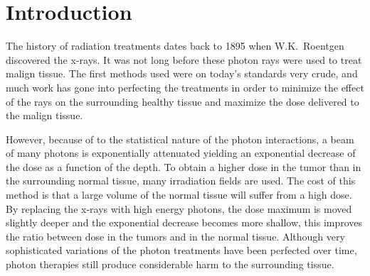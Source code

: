 %


\cleardoublepage
\storeinipagenumber
{}
\setcounter{page}{1}


\section{Introduction}
\thispagestyle{empty}
The history of radiation treatments dates back to 1895 when W.K.~Roentgen discovered the x-rays. It was not long before these photon rays were used to treat malign tissue. The first methods used were on today's standards very crude, and much work has gone into perfecting the treatments in order to minimize the effect of the rays on the surrounding healthy tissue and maximize the dose delivered to the malign tissue.

However, because of to the statistical nature of the photon interactions, a beam of many photons is
exponentially attenuated yielding an exponential decrease of the dose as a function of the depth. To
obtain a higher dose in the tumor than in the surrounding normal tissue, many irradiation
fields are used. The cost of this method is that a large volume of the normal tissue
will suffer from a high dose. By replacing the x-rays with high energy photons, the dose
maximum is moved slightly deeper and the exponential decrease becomes more shallow,
this improves the ratio between dose in the tumors and in the normal tissue. Although very sophisticated variations of the photon treatments have been perfected over time, photon therapies still produce considerable harm to the surrounding tissue. 

